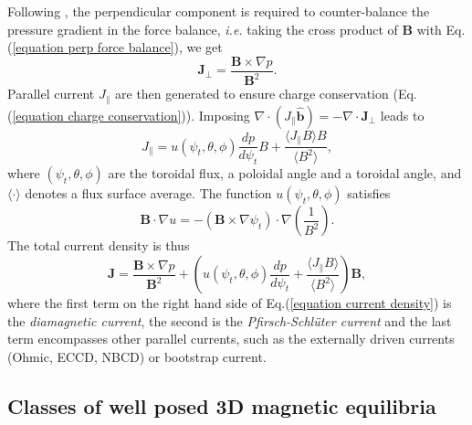 \documentclass[my_thesis.tex]{subfiles}
\begin{document}
Following \citet{Helander2014}, the perpendicular component is required to counter-balance the pressure gradient in the force balance, \textit{i.e.} taking the cross product of $\mathbf{B}$ with Eq.(\ref{equation perp force balance}), we get
\begin{equation}
	\mathbf{J}_\perp = \frac{\mathbf{B}\times\nabla p}{\mathbf{B}^2}.
\end{equation}
Parallel current $J_\parallel$ are then generated to ensure charge conservation (Eq.(\ref{equation charge conservation})). Imposing $\nabla \cdot (J_\parallel\mathbf{\hat{b}}) = - \nabla\cdot\mathbf{J}_\perp$ leads to 
\begin{equation}
	J_\parallel = u(\psi_t,\theta,\phi)\frac{dp}{d\psi_t}B + \frac{\langle J_\parallel B\rangle B}{\langle B^2\rangle},
\end{equation}
where $(\psi_t,\theta,\phi)$ are the toroidal flux, a poloidal angle and a toroidal angle, and $\langle\cdot\rangle$ denotes a flux surface average. The function $u(\psi_t,\theta,\phi)$ satisfies
\begin{equation}
	\mathbf{B}\cdot\nabla u = -(\mathbf{B}\times\nabla\psi_t)\cdot\nabla\left(\frac{1}{B^2}\right). \label{eq.diff_u}
\end{equation}
The total current density is thus
\begin{equation}
	\mathbf{J} = \frac{\mathbf{B}\times\nabla p}{\mathbf{B}^2} + \left(u(\psi_t,\theta,\phi)\frac{dp}{d\psi_t} + \frac{\langle J_\parallel B\rangle}{\langle B^2\rangle}\right)\mathbf{B}, \label{equation current density}
\end{equation}
where the first term on the right hand side of Eq.(\ref{equation current density}) is the \emph{diamagnetic current}, the second is the \emph{Pfirsch-Schl\"uter current} and the last term encompasses other parallel currents, such as the externally driven currents (Ohmic, \ac{ECCD}, \ac{NBCD}) or bootstrap current.




\subsection{Classes of well posed 3D magnetic equilibria}\label{sec. diverging currents}
\end{document}
